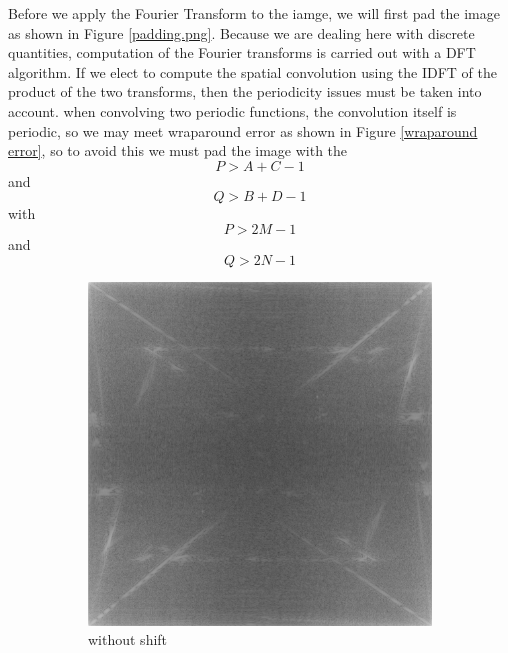 \documentclass[
	12pt, %
]{style/fphw}
\begin{document}
Before we apply the Fourier Transform to the iamge, we will first pad the image as shown in Figure \ref{padding.png}. Because we are dealing here with discrete quantities, computation of the Fourier transforms is carried out with a DFT algorithm. If we elect to compute the spatial convolution using the IDFT of the product of the two transforms, then the periodicity issues must be taken into account. when convolving two periodic functions, the convolution itself is periodic, so we may meet wraparound error as shown in Figure \ref{wraparound error}, so to avoid this we must pad the image with the $$P > A + C - 1$$ and $$Q > B + D - 1$$ with $$P > 2M - 1$$ and $$Q > 2N - 1$$

\begin{figure}[H]
     \centering
     \begin{subfigure}[b]{0.2\textwidth}
         \centering
         \includegraphics[width=\textwidth]{plots2/Q5_1_spectrum_noshift.png}
         \caption{without shift}
         \label{Q5_2_lowpass_30_error.tif}
     \end{subfigure}
     \hfill
     \begin{subfigure}[b]{0.2\textwidth}
         \centering

\end{subfigure}
\end{figure}
\end{document}
